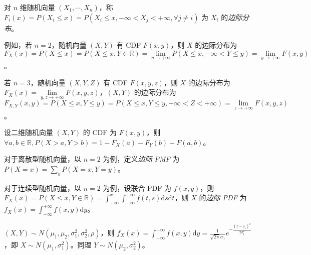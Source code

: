 \documentclass[../main.tex]{subfiles}
\begin{document}
对 $n$ 维随机向量 $(X_1,\cdots,X_n)$，称 $F_i(x)=P(X_i\leq x)=P(X_i\leq x,-\infty<X_j<+\infty,\forall j\neq i)$ 为 $X_i$ 的\emph{边际分布}。

例如，若 $n=2$，随机向量 $(X,Y)$ 有 CDF $F(x,y)$，则 $X$ 的边际分布为 $F_X(x)=P(X\leq x)=P(X\leq x,Y\in\mathbb R)=\lim\limits_{y\rightarrow+\infty}P(X\leq x,-\infty<Y\leq y)=\lim\limits_{y\rightarrow+\infty}F(x,y)$。

若 $n=3$，随机向量 $(X,Y,Z)$ 有 CDF $F(x,y,z)$，则 $X$ 的边际分布为 $F_X(x)=\lim\limits_{y,z\rightarrow+\infty}F(x,y,z)$，$(X,Y)$ 的边际分布为 $F_{X,Y}(x,y)=P(X\leq x,Y\leq y)=P(X\leq x,Y\leq y,-\infty<Z<+\infty)=\lim\limits_{z\rightarrow+\infty}F(x,y,z)$。

\begin{example}
    设二维随机向量 $(X,Y)$ 的 CDF 为 $F(x,y)$，则 $\forall a,b\in\mathbb R,P(X>a,Y>b)=1-F_X(a)-F_Y(b)+F(a,b)$。
\end{example}

对于离散型随机向量，以 $n=2$ 为例，定义\emph{边际 PMF} 为 $P(X=x)=\sum\limits_y{P(X=x,Y=y)}$。

对于连续型随机向量，以 $n=2$ 为例，设联合 PDF 为 $f(x,y)$，则 $F_X(x)=P(X\leq x,Y\in\mathbb R)=\int_{-\infty}^x\int_{-\infty}^{+\infty}f(t,s)\mathrm ds\mathrm dt$，则 $X$ 的\emph{边际 PDF} 为 $f_X(x)=\int_{-\infty}^{+\infty}f(x,y)\mathrm dy$。

\begin{example}
    $(X,Y)\sim N(\mu_1,\mu_2,\sigma_1^2,\sigma_2^2,\rho)$，则 $f_X(x)=\int_{-\infty}^{+\infty}f(x,y)\mathrm dy=\frac1{\sqrt{2\pi}\sigma_1}e^{-\frac{(x-\mu_1)^2}{2\sigma_1^2}}$，即 $X\sim N(\mu_1,\sigma_1^2)$。同理 $Y\sim N(\mu_2,\sigma_2^2)$。
\end{example}
\end{document}
